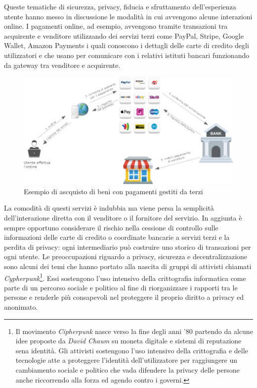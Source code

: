 Queste tematiche di sicurezza, privacy, fiducia e sfruttamento dell'esperienza utente hanno messo in discussione le modalità in cui avvengono alcune interazioni online. I pagamenti online, ad esempio, avvengono tramite transazioni tra acquirente e venditore utilizzando dei servizi terzi come PayPal, Stripe, Google Wallet, Amazon Payments i quali conoscono i dettagli delle carte di credito degli utilizzatori e che usano per comunicare con i relativi istituti bancari funzionando da gateway tra venditore e acquirente.\newline
\begin{figure}
    \centering
    \includegraphics[width=\textwidth]{images/onlinepayments.png}
    \caption{Esempio di ascquisto di beni con pagamenti gestiti da terzi}
\end{figure}
La comodità di questi servizi è indubbia ma viene persa la semplicità dell'interazione diretta con il venditore o il fornitore del servizio. In aggiunta è sempre opportuno considerare il rischio nella cessione di controllo sulle informazioni delle carte di credito o coordinate bancarie a servizi terzi e la perdita di privacy: ogni intermediario può costruire uno storico di transazioni per ogni utente.\newline\newline
Le preoccupazioni riguardo a privacy, sicurezza e decentralizzazione sono alcuni dei temi che hanno portato alla nascita di gruppi di attivisti chiamati \textit{Cypherpunk}\footnote{Il movimento \textit{Cipherpunk} nasce verso la fine degli anni '80 partendo da alcune idee proposte da \textit{David Chaum} su moneta digitale e sistemi di reputazione sena identità. Gli attivisti sostengono l'uso intensivo della crittografia e delle tecnologie atte a proteggere l'identità dell'utilizzatore per raggiungere un cambiamento sociale e politico che vada difendere la privacy delle persone anche riccorrendo alla forza ed agendo contro i governi.}. Essi sostengono l'uso intensivo della crittografia informatica come parte di un percorso sociale e politico al fine di riorganizzare i rapporti tra le persone e renderle più consapevoli nel proteggere il proprio diritto a privacy ed anonimato.\newline\newline
